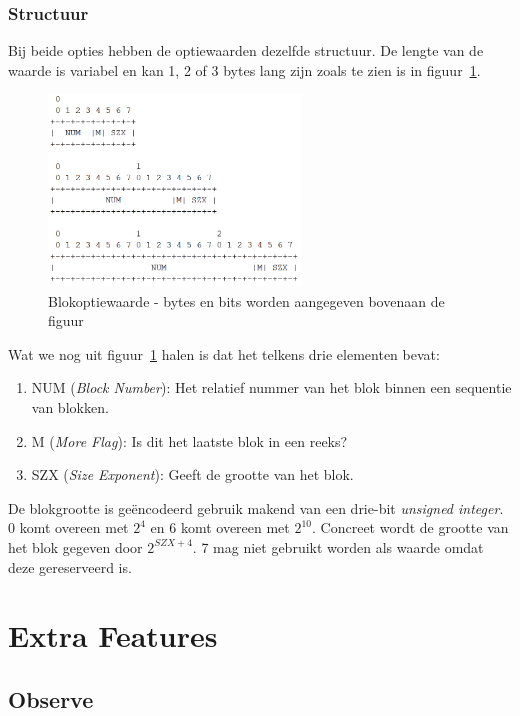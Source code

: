 \subsubsection{Structuur}
Bij beide opties hebben de optiewaarden dezelfde structuur. De lengte van de waarde is variabel en kan 1, 2 of 3 bytes lang zijn zoals te zien is in figuur~\ref{fig:blockOption}.
\begin{figure}[h]
\centering
\includegraphics[width=0.6\textwidth]{fig/blockOption}
\caption{Blokoptiewaarde - bytes en bits worden aangegeven bovenaan de figuur}
\label{fig:blockOption}
\end{figure}

\noindent
Wat we nog uit figuur~\ref{fig:blockOption} halen is dat het telkens drie elementen bevat:
\begin{enumerate}
\item NUM (\textit{Block Number}): Het relatief nummer van het blok binnen een sequentie van blokken.
\item M (\textit{More Flag}): Is dit het laatste blok in een reeks?
\item SZX (\textit{Size Exponent}): Geeft de grootte van het blok.
\end{enumerate}

\noindent
De blokgrootte is ge\"{e}ncodeerd gebruik makend van een drie-bit \textit{unsigned integer}. 0 komt overeen met $ 2^{4} $ en 6 komt overeen met  $ 2^{10} $. Concreet wordt de grootte van het blok gegeven door  $ 2^{ SZX + 4} $. 7 mag niet gebruikt worden als waarde omdat deze gereserveerd is.

\section{Extra Features}

\subsection{Observe} \label{observe}

